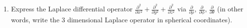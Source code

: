\begin{enumerate}
\begin{enumerate}
\item \label{problemLaplaceInSpherical} Express the Laplace differential operator $\frac{\partial^2}{\partial x^2}+\frac{\partial^2}{\partial y^2}+\frac{\partial^2}{\partial z^2}$ via  $\frac{\partial }{\partial \rho}$, $\frac{\partial }{\partial \phi}$, $\frac{\partial }{\partial \theta}$ (in other words, write the 3 dimensional Laplace operator in spherical coordinates).

\end{enumerate}
\end{enumerate}